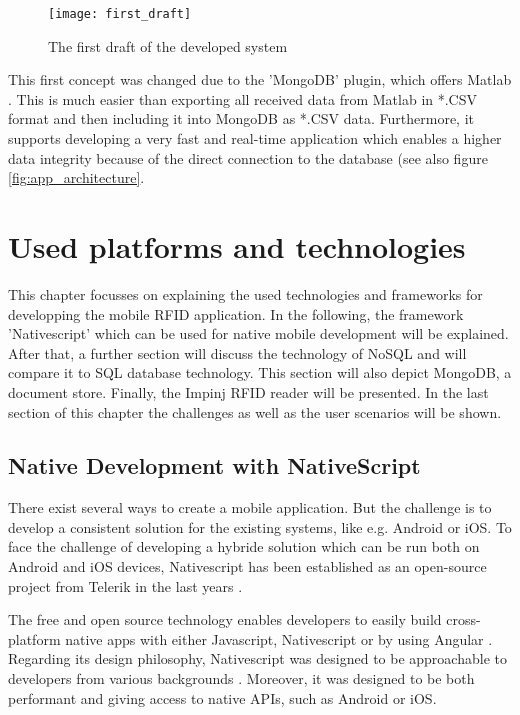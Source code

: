 \begin{figure}
\centering
\texttt{[image: first\_draft]} 
\caption{\label{fig:first_draft}The first draft of the developed system} 
\end{figure}

This first concept was changed due to the 'MongoDB' plugin, which offers Matlab \cite{matlab_mongodb}. This is much easier than exporting all received data from Matlab in *.CSV format and then including it into MongoDB as *.CSV data. Furthermore, it supports developing a very fast and real-time application which enables a higher data integrity because of the direct connection to the database (see also figure \ref{fig:app_architecture}.  

\section{Used platforms and technologies} \label{platforms}

This chapter focusses on explaining the used technologies and frameworks for developping the mobile RFID application. In the following, the framework 'Nativescript' which can be used for native mobile development will be explained. After that, a further section will discuss the technology of NoSQL and will compare it to SQL database technology. This section will also depict MongoDB, a document store. Finally, the Impinj RFID reader will be presented. In the last section \pageref{app_development} of this chapter the challenges as well as the user scenarios will be shown. 

\subsection{Native Development with NativeScript} 

There exist several ways to create a mobile application. But the challenge is to develop a consistent solution for the existing systems, like e.g. Android or iOS.
To face the challenge of developing a hybride solution which can be run both on Android and iOS devices, Nativescript has been established as an open-source project from Telerik in the last years \cite{nativescript}. 

The free and open source technology enables developers to easily build cross-platform native apps with either Javascript, Nativescript or by using Angular \cite{nativescript}. 
Regarding its design philosophy, Nativescript was designed to be approachable to developers from various backgrounds \cite{nativescript}. Moreover, it was designed to be both performant and giving access to native APIs, such as Android or iOS.

